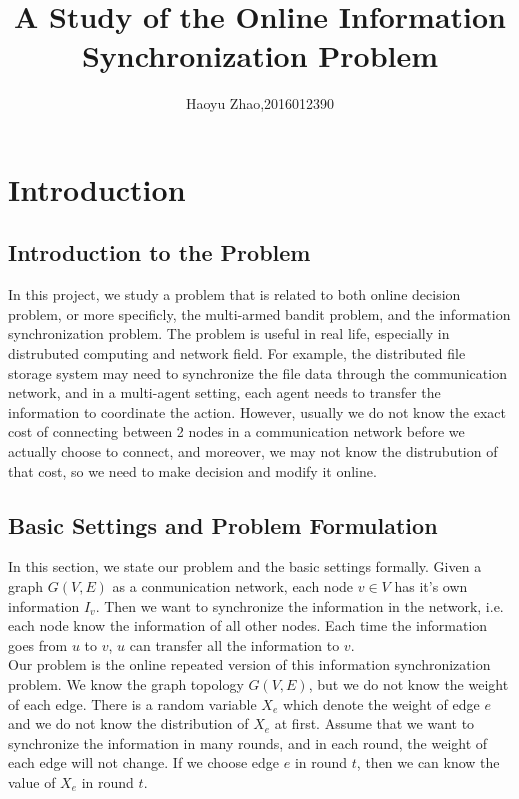 \documentclass{article}
\title{\bf\huge A Study of the Online Information Synchronization Problem}
\author{Haoyu Zhao,2016012390}
\date{}
\theoremstyle{plain}
\theoremstyle{definition}
\theoremstyle{remark}
\begin{document}
    \maketitle

    \section{Introduction}
    \subsection{Introduction to the Problem}
    In this project, we study a problem that is related to both online decision problem, or more specificly, the multi-armed bandit problem, and the information synchronization problem. The problem is useful in real life, especially in distrubuted computing and network field. For example, the distributed file storage system may need to synchronize the file data through the communication network, and in a multi-agent setting, each agent needs to transfer the information to coordinate the action. However, usually we do not know the exact cost of connecting between 2 nodes in a communication network before we actually choose to connect, and moreover, we may not know the distrubution of that cost, so we need to make decision and modify it online.

    \subsection{Basic Settings and Problem Formulation}
    In this section, we state our problem and the basic settings formally. Given a graph $G(V,E)$ as a conmunication network, each node $v\in V$ has it's own information $I_v$. Then we want to synchronize the information in the network, i.e. each node know the information of all other nodes. Each time the information goes from $u$ to $v$, $u$ can transfer all the information to $v$.\\

    Our problem is the online repeated version of this information synchronization problem. We know the graph topology $G(V,E)$, but we do not know the weight of each edge. There is a random variable $X_e$ which denote the weight of edge $e$ and we do not know the distribution of $X_e$ at first. Assume that we want to synchronize the information in many rounds, and in each round, the weight of each edge will not change. If we choose edge $e$ in round $t$, then we can know the value of $X_e$ in round $t$.\\
\end{document}
